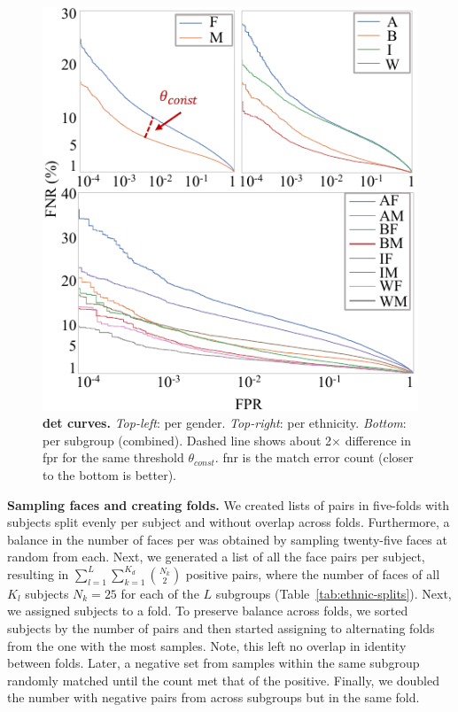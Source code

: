 \begin{figure}[!t] 
	\centering    
	\includegraphics[width=.9\linewidth]{figures/detcurve-improved.pdf}
		\caption{\small{\textbf{\gls{det} curves.} \emph{Top-left}: per gender. \emph{Top-right}: per ethnicity. \emph{Bottom}: per subgroup (\ie combined). Dashed line shows about 2$\times$ difference in \gls{fpr} for the same threshold $\theta_{const}$. \gls{fnr} is the match error count (closer to the bottom is better).}}
\label{fig:detcurves} 
\end{figure} 
\noindent\textbf{Sampling faces and creating folds.} We created lists of pairs in five-folds with subjects split evenly per subject and without overlap across folds. Furthermore, a balance in the number of faces per was obtained by sampling twenty-five faces at random from each. Next, we generated a list of all the face pairs per subject, resulting in $\sum_{l=1}^{L}\sum_{k=1}^{K_d} {N_k \choose 2}$ positive pairs, where the number of faces of all $K_l$ subjects $N_k=25$  for each of the $L$ subgroups (Table~\ref{tab:ethnic-splits}). Next, we assigned subjects to a fold. To preserve balance across folds, we sorted subjects by the number of pairs and then started assigning to alternating folds from the one with the most samples. Note, this left no overlap in identity between folds. Later, a negative set from samples within the same subgroup randomly matched until the count met that of the positive. Finally, we doubled the number with negative pairs from across subgroups but in the same fold.

